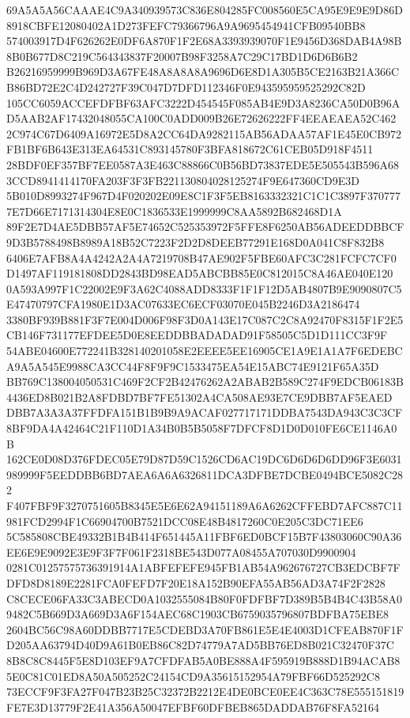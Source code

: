 \documentclass[UTF8,fontset=fandol,zihao=-4,a4paper]{ctexart}
\begin{document}
{{69A5A5A56CAAAE4C9A340939573C836E804285FC008560E5CA95E9E9E9D86D8918CBFE12080402A1D273FEFC79366796A9A9695454941CFB09540BB8
574003917D4F626262E0DF6A870F1F2E68A3393939070F1E9456D368DAB4A98B8B0B677D8C219C564343837F20007B98F3258A7C29C17BD1D6D6B6B2
B26216959999B969D3A67FE48A8A8A8A9696D6E8D1A305B5CE2163B21A366CB86BD72E2C4D242727F39C047D7DFD112346F0E943595959525292C82D
105CC6059ACCEFDFBF63AFC3222D454545F085AB4E9D3A8236CA50D0B96AD5AAB2AF17432048055CA100C0ADD009B26E72626222FF4EEAEAEA52C462
2C974C67D6409A16972E5D8A2CC64DA9282115AB56ADAA57AF1E45E0CB972FB1BF6B643E313EA64531C893145780F3BFA818672C61CEB05D918F4511
28BDF0EF357BF7EE0587A3E463C88866C0B56BD73837EDE5E505543B596A683CCD8941414170FA203F3F3FB221130804028125274F9E647360CD9E3D
5B010D8993274F967D4F020202E09E8C1F3F5EB8163332321C1C1C3897F3707777E7D66E7171314304E8E0C1836533E1999999C8AA5892B682468D1A
89F2E7D4AE5DBB57AF5E74652C525353972F5FFE8F6250AB56ADEEDDBBCF9D3B5788498B8989A18B52C7223F2D2D8DEEB77291E168D0A041C8F832B8
6406E7AFB8A4A4242A2A4A7219708B47AE902F5FBE60AFC3C281FCFC7CF0D1497AF119181808DD2843BD98EAD5ABCBB85E0C812015C8A46AE040E120
0A593A997F1C22002E9F3A62C4088ADD8333F1F1F12D5AB4807B9E9090807C5E47470797CFA1980E1D3AC07633EC6ECF03070E045B2246D3A2186474
3380BF939B881F3F7E004D006F98F3D0A143E17C087C2C8A92470F8315F1F2E5CB146F731177EFDEE5D0E8EEDDBBADADAD91F58505C5D1D111CC3F9F
54ABE04600E772241B328140201058E2EEEE5EE16905CE1A9E1A1A7F6EDEBCA9A5A545E9988CA3CC44F8F9F9C1533475EA54E15ABC74E9121F65A35D
BB769C138004050531C469F2CF2B42476262A2ABAB2B589C274F9EDCB06183B4436ED8B021B2A8FDBD7BF7FE51302A4CA508AE93E7CE9DBB7AF5EAED
DBB7A3A3A37FFDFA151B1B9B9A9ACAF027717171DDBA7543DA943C3C3CF8BF9DA4A42464C21F110D1A34B0B5B5058F7DFCF8D1D0D010FE6CE1146A0B
162CE0D08D376FDEC05E79D87D59C1526CD6AC19DC6D6D6D6DD96F3E6031989999F5EEDDBB6BD7AEA6A6A6326811DCA3DFBE7DCBE0494BCE5082C282
F407FBF9F3270751605B8345E5E6E62A94151189A6A6262CFFEBD7AFC887C11981FCD2994F1C66904700B7521DCC08E48B4817260C0E205C3DC71EE6
5C585808CBE49332B1B4B414F651445A11FBF6ED0BCF15B7F43803060C90A36EE6E9E9092E3E9F3F7F061F2318BE543D077A08455A707030D9900904
0281C01257575736391914A1ABFEFEFE945FB1AB54A962676727CB3EDCBF7FDFD8D8189E2281FCA0FEFD7F20E18A152B90EFA55AB56AD3A74F2F2828
C8CECE06FA33C3ABECD0A1032555084B80F0FDFBF7D389B5B4B4C43B58A09482C5B669D3A669D3A6F154AEC68C1903CB6759035796807BDFBA75EBE8
2604BC56C98A60DDBB7717E5CDEBD3A70FB861E5E4E4003D1CFEAB870F1FD205AA63794D40D9A61B0EB86C82D74779A7AD5BB76ED8B021C32470F37C
8B8C8C8445F5E8D103EF9A7CFDFAB5A0BE888A4F595919B888D1B94ACAB85E0C81C01ED8A50A505252C24154CD9A35615152954A79FBF66D525292C8
73ECCF9F3FA27F047B23B25C32372B2212E4DE0BCE0EE4C363C78E555151819FE7E3D13779F2E41A356A50047EFBF60DFBEB865DADDAB76F8FA52164
}}
\end{document}
